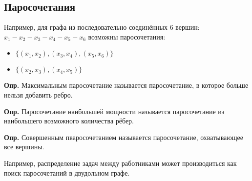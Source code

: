 \documentclass[10pt]{article}
\begin{document}
\subsection*{Паросочетания}
\par Например, для графа из последовательно соединённых 6 вершин: $x_{1} - x_{2} - x_{3} - x_{4} - x_{5} - x_{6}$ возможны паросочетания:
\begin{itemize}
    \item $\{ (x_{1}, x_{2}), (x_{3}, x_{4}), (x_{5}, x_{6}) \}$
    \item $\{ (x_{2}, x_{3}), (x_{4}, x_{5}) \}$
\end{itemize}

\par\textbf{Опр.} Максимальным паросочетание называется паросочетание, в которое больше нельзя добавить ребро.
\par\textbf{Опр.} Паросочетание наибольшей мощности называется паросочетание из наибольшего возможного количества рёбер.
\par\textbf{Опр.} Совершенным пваросочетанием называется паросочетание, охватывающее все вершины.

\par Например, распределение задач между работниками может производиться как поиск паросочетаний в двудольном графе.
\end{document}
